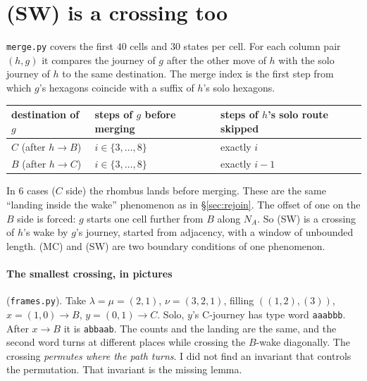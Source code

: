 \documentclass[11pt]{article}
\theoremstyle{definition}
\newcommand{\toB}{\!\to\!B}
\newcommand{\toC}{\!\to\!C}
\begin{document}
\section{(SW) is a crossing too}\label{sec:sw}
\texttt{merge.py} covers the first $40$ cells and $30$ states per cell. For each column pair $(h,g)$ it compares the journey of $g$ after
the other move of $h$ with the solo journey of $h$ to the same destination. The merge index is the first step from which $g$'s
hexagons coincide with a suffix of $h$'s solo hexagons.
\begin{center}\begin{tabular}{lll}\toprule
destination of $g$ & steps of $g$ before merging & steps of $h$'s solo route skipped\\\midrule
$C$ (after $h\toB$) & $i\in\{3,\dots,8\}$ & exactly $i$\\
$B$ (after $h\toC$) & $i\in\{3,\dots,8\}$ & exactly $i-1$\\\bottomrule
\end{tabular}\end{center}
In $6$ cases ($C$ side) the rhombus lands before merging. These are the same ``landing inside the wake'' phenomenon as in \S\ref{sec:rejoin}.
The offset of one on the $B$ side is forced: $g$ starts one cell further from $B$ along $N_A$. So (SW) is a crossing of $h$'s wake by
$g$'s journey, started from adjacency, with a window of unbounded length. (MC) and (SW) are two boundary conditions of one
phenomenon.

\paragraph{The smallest crossing, in pictures} (\texttt{frames.py}). Take $\lambda=\mu=(2,1)$, $\nu=(3,2,1)$, filling $((1,2),(3))$,
$x=(1,0)\toB$, $y=(0,1)\toC$. Solo, $y$'s C-journey has type word \texttt{aaabbb}. After $x\toB$ it is \texttt{abbaab}. The counts and
the landing are the same, and the second word turns at different places while crossing the $B$-wake diagonally. The crossing
\emph{permutes where the path turns}. I did not find an invariant that controls the permutation. That invariant is the missing lemma.
\end{document}
